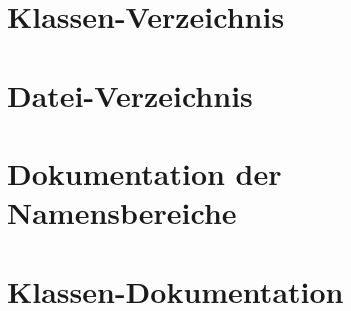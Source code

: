 \documentclass[twoside]{book}
\begin{document}
\chapter{Klassen-\/\-Verzeichnis}

\chapter{Datei-\/\-Verzeichnis}

\chapter{Dokumentation der Namensbereiche}


\chapter{Klassen-\/\-Dokumentation}
















































\end{document}
